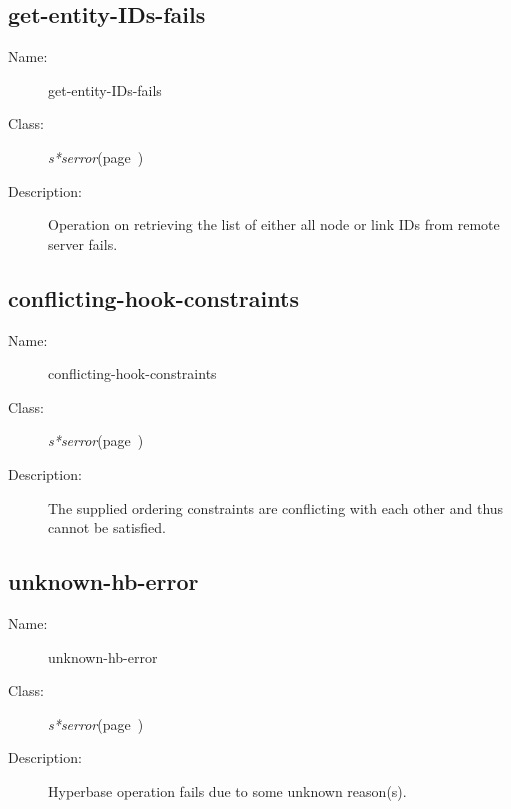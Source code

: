 \subsection{get-entity-IDs-fails}
\label{get-entity-IDs-fails}

\begin{description}
\item [Name:]  get-entity-IDs-fails

\item [Class:]
{\sl s*serror}\hfill(page~\pageref{s*serror})

\item [Description:]
Operation on retrieving the list of either all node or link
IDs from remote server fails.



\end{description}
\horizontalline

\subsection{conflicting-hook-constraints}
\label{conflicting-hook-constraints}

\begin{description}
\item [Name:]  conflicting-hook-constraints

\item [Class:]
{\sl s*serror}\hfill(page~\pageref{s*serror})

\item [Description:]
The supplied ordering constraints are conflicting with each
other and thus cannot be satisfied.

\end{description}
\horizontalline

\subsection{unknown-hb-error}
\label{unknown-hb-error}

\begin{description}

\item [Name:]  unknown-hb-error


\item [Class:]
{\sl s*serror}\hfill(page~\pageref{s*serror})


\item [Description:] 
Hyperbase operation fails due to some unknown reason(s).



\end{description}
\horizontalline

